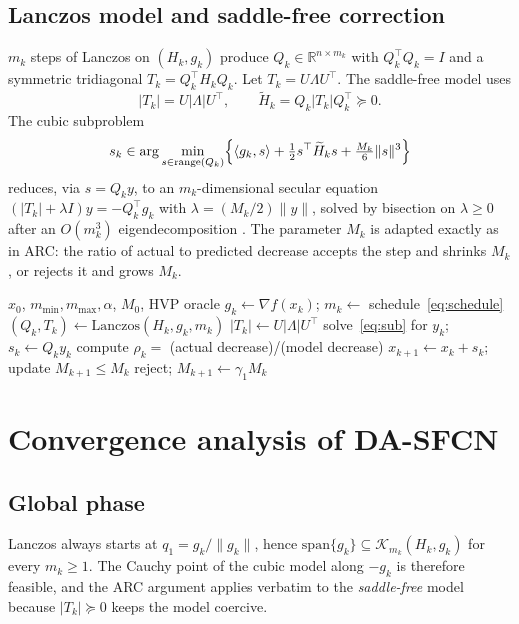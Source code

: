 \documentclass[11pt,a4paper]{article}
\theoremstyle{definition}
\begin{document}
\subsection{Lanczos model and saddle-free correction}
$m_k$ steps of Lanczos on $(H_k,g_k)$ produce $Q_k\in\mathbb{R}^{n\times m_k}$
with $Q_k^\top Q_k=I$ and a symmetric tridiagonal $T_k=Q_k^\top H_k Q_k$.
Let $T_k=U\Lambda U^\top$. The saddle-free model uses
\begin{equation}\label{eq:sf}
|T_k|=U|\Lambda|U^\top,\qquad
\widetilde H_k=Q_k|T_k|Q_k^\top\succeq 0.
\end{equation}
The cubic subproblem
\begin{equation}\label{eq:sub}
s_k\in\arg\min_{s\in\mathrm{range}(Q_k)}
\Bigl\{\langle g_k,s\rangle+\tfrac12 s^\top\widetilde H_k s
+\tfrac{M_k}{6}\|s\|^3\Bigr\}
\end{equation}
reduces, via $s=Q_k y$, to an $m_k$-dimensional secular equation
$(|T_k|+\lambda I)y=-Q_k^\top g_k$ with $\lambda=(M_k/2)\|y\|$, solved by
bisection on $\lambda\ge 0$ after an $O(m_k^3)$ eigendecomposition
\cite{cartis2011}. The parameter $M_k$ is adapted exactly as in ARC:
the ratio of actual to predicted decrease accepts the step and shrinks
$M_k$, or rejects it and grows $M_k$.

\begin{algorithm}[t]
\caption{DA-SFCN}\label{alg:dasfcn}
\begin{algorithmic}[1]
\Require $x_0$, $m_{\min},m_{\max},\alpha$, $M_0$, HVP oracle
  \State $g_k\gets\nabla f(x_k)$; \quad $m_k\gets$ schedule~\eqref{eq:schedule}
  \State $(Q_k,T_k)\gets\mathrm{Lanczos}(H_k,g_k,m_k)$
  \State $|T_k|\gets U|\Lambda|U^\top$
  \State solve~\eqref{eq:sub} for $y_k$; \quad $s_k\gets Q_k y_k$
  \State compute $\rho_k=$ (actual decrease)/(model decrease)
        $x_{k+1}\gets x_k+s_k$; \quad update $M_{k+1}\le M_k$
  \Else{} reject; \quad $M_{k+1}\gets\gamma_1 M_k$
  \EndIf
\EndFor
\end{algorithmic}
\end{algorithm}

\section{Convergence analysis of DA-SFCN}
\subsection{Global phase}
Lanczos always starts at $q_1=g_k/\|g_k\|$, hence
$\mathrm{span}\{g_k\}\subseteq\mathcal{K}_{m_k}(H_k,g_k)$ for every
$m_k\ge 1$. The Cauchy point of the cubic model along $-g_k$ is therefore
feasible, and the ARC argument applies verbatim to the
\emph{saddle-free} model because $|T_k|\succeq 0$ keeps the model coercive.
\end{document}
